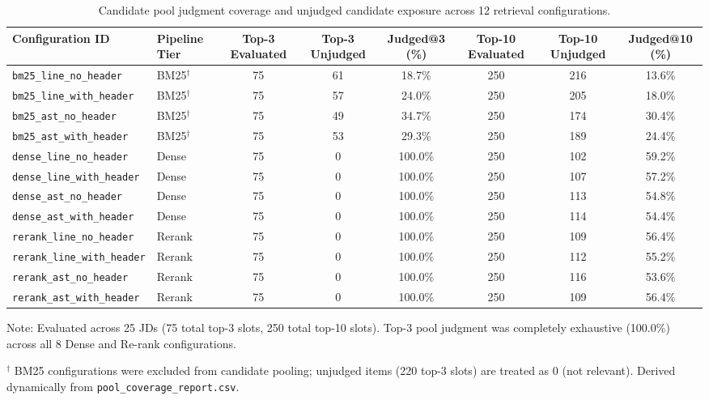 \begin{table}[t]
\caption{Candidate pool judgment coverage and unjudged candidate exposure across 12 retrieval configurations.}
\label{tab:candidate_pool_coverage}
\centering\footnotesize
\setlength{\tabcolsep}{3pt}
\begin{threeparttable}
\begin{tabular}{@{}llcccccc@{}}
\toprule
Configuration ID & Pipeline Tier & Top-3 Evaluated & Top-3 Unjudged & Judged@3 (\%) & Top-10 Evaluated & Top-10 Unjudged & Judged@10 (\%) \\
\midrule
\texttt{bm25\_line\_no\_header} & BM25$^{\dagger}$ & 75 & 61 & 18.7\% & 250 & 216 & 13.6\% \\
\texttt{bm25\_line\_with\_header} & BM25$^{\dagger}$ & 75 & 57 & 24.0\% & 250 & 205 & 18.0\% \\
\texttt{bm25\_ast\_no\_header} & BM25$^{\dagger}$ & 75 & 49 & 34.7\% & 250 & 174 & 30.4\% \\
\texttt{bm25\_ast\_with\_header} & BM25$^{\dagger}$ & 75 & 53 & 29.3\% & 250 & 189 & 24.4\% \\
\cmidrule(lr){1-8}
\texttt{dense\_line\_no\_header} & Dense & 75 & 0 & 100.0\% & 250 & 102 & 59.2\% \\
\texttt{dense\_line\_with\_header} & Dense & 75 & 0 & 100.0\% & 250 & 107 & 57.2\% \\
\texttt{dense\_ast\_no\_header} & Dense & 75 & 0 & 100.0\% & 250 & 113 & 54.8\% \\
\texttt{dense\_ast\_with\_header} & Dense & 75 & 0 & 100.0\% & 250 & 114 & 54.4\% \\
\cmidrule(lr){1-8}
\texttt{rerank\_line\_no\_header} & Rerank & 75 & 0 & 100.0\% & 250 & 109 & 56.4\% \\
\texttt{rerank\_line\_with\_header} & Rerank & 75 & 0 & 100.0\% & 250 & 112 & 55.2\% \\
\texttt{rerank\_ast\_no\_header} & Rerank & 75 & 0 & 100.0\% & 250 & 116 & 53.6\% \\
\texttt{rerank\_ast\_with\_header} & Rerank & 75 & 0 & 100.0\% & 250 & 109 & 56.4\% \\
\bottomrule
\end{tabular}
\begin{tablenotes}\footnotesize
\item[] Note: Evaluated across 25 JDs (75 total top-3 slots, 250 total top-10 slots). Top-3 pool judgment was completely exhaustive (100.0\%) across all 8 Dense and Re-rank configurations.
\item[$^{\dagger}$] BM25 configurations were excluded from candidate pooling; unjudged items (220 top-3 slots) are treated as 0 (not relevant). Derived dynamically from \texttt{pool\_coverage\_report.csv}.
\end{tablenotes}
\end{threeparttable}
\end{table}